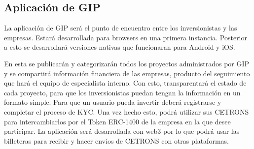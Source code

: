 \subsection{Aplicación de GIP}
La aplicación de GIP será  el punto de encuentro entre los inversionistas y las empresas. Estará desarrollada para browsers en una primera instancia. Posterior a esto se desarrollará versiones nativas que funcionaran para Android y  iOS. 

En esta se publicarán y categorizarán todos los proyectos administrados por GIP y se compartirá información financiera de las empresas, producto del seguimiento que hará el equipo de especialista interno. Con esto, transparentará el estado de cada proyecto, para que los inversionistas puedan tengan la información en un formato simple. 
Para que un usuario pueda invertir deberá registrarse y completar el proceso de KYC. Una vez hecho esto, podrá utilizar sus CETRONS para intercambiarlos por el Token ERC-1400 de la empresa en la que desee participar. La aplicación será desarrollada con web3\cite{web3} por lo que podrá usar las billeteras para recibir y hacer envíos de CETRONS con otras plataformas.
